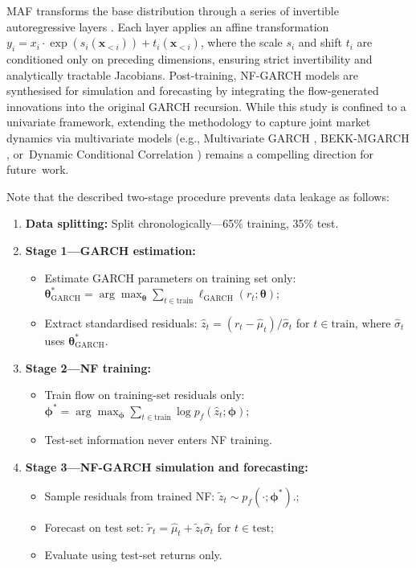 \documentclass[risks,article,accept,pdftex,moreauthors]{Definitions/mdpi}
\begin{document}
MAF transforms the base distribution through a series of invertible autoregressive layers \citep{papamakarios2017masked}. Each layer applies an affine transformation $y_i = x_i \cdot \exp(s_i(\mathbf{x}_{<i})) + t_i(\mathbf{x}_{<i})$, where the scale $s_i$ and shift $t_i$ are conditioned only on preceding dimensions, ensuring strict invertibility and analytically tractable Jacobians. Post-training, NF-GARCH models are synthesised for simulation and forecasting by integrating the flow-generated innovations into the original GARCH recursion. While this study is confined to a univariate framework, extending the methodology to capture joint market dynamics via multivariate models (e.g., Multivariate GARCH \citep{bollerslev1990modelling}, BEKK-MGARCH \citep{engle1995multivariate}, or~Dynamic Conditional Correlation \citep{engle2002dynamic}) remains a compelling direction for future~work.


Note that the described two-stage procedure prevents data leakage as follows:

\begin{enumerate}
    \item \textbf{Data splitting:} Split chronologically—65\% training, 35\% test.
    
    \item \textbf{Stage 1---GARCH estimation:} 
    \begin{itemize}
        \item Estimate GARCH parameters on training set only: $\boldsymbol{\theta}_{\text{GARCH}}^* = \arg\max_{\boldsymbol{\theta}} \sum_{t \in \text{train}} \ell_{\text{GARCH}}(r_t; \boldsymbol{\theta})$;
        \item Extract standardised residuals: $\hat{z}_t = (r_t - \hat{\mu}_t) / \hat{\sigma}_t$ for $t \in \text{train}$, where $\hat{\sigma}_t$ uses $\boldsymbol{\theta}_{\text{GARCH}}^*$.
    \end{itemize}
    
    \item \textbf{Stage 2---NF training:}
    \begin{itemize}
        \item Train flow on training-set residuals only: $\boldsymbol{\phi}^* = \arg\max_{\boldsymbol{\phi}} \sum_{t \in \text{train}} \log p_f(\hat{z}_t; \boldsymbol{\phi})$;
        \item Test-set information never enters NF training.
    \end{itemize}
    
    \item \textbf{Stage 3---NF-GARCH simulation and forecasting:}
    \begin{itemize}
        \item Sample residuals from trained NF: $\tilde{z}_t \sim p_f(\cdot; \boldsymbol{\phi}^*)$.;
        \item Forecast on test set: $\tilde{r}_t = \hat{\mu}_t + \tilde{z}_t \hat{\sigma}_t$ for $t \in \text{test}$;
        \item Evaluate using test-set returns only.
    \end{itemize}
\end{enumerate}
\end{document}
